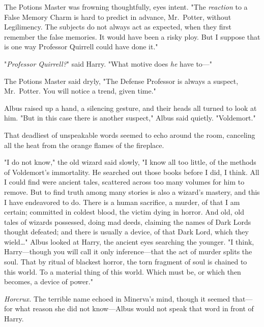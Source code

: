 The Potions Master was frowning thoughtfully, eyes intent. "The \emph{reaction} 
to a False Memory Charm is hard to predict in advance, Mr.~Potter, without 
Legilimency. The subjects do not always act as expected, when they first 
remember the false memories. It would have been a risky ploy. But I suppose 
that is one way Professor Quirrell could have done it."

"\emph{Professor Quirrell?}" said Harry. "What motive does \emph{he} have to---"

The Potions Master said dryly, "The Defense Professor is always a suspect, 
Mr.~Potter. You will notice a trend, given time."

Albus raised up a hand, a silencing gesture, and their heads all turned to look 
at him. "But in this case there is another suspect," Albus said quietly. 
"Voldemort."

That deadliest of unspeakable words seemed to echo around the room, canceling 
all the heat from the orange flames of the fireplace.

"I do not know," the old wizard said slowly, "I know all too little, of the 
methods of Voldemort's immortality. He searched out those books before I did, I 
think. All I could find were ancient tales, scattered across too many volumes 
for him to remove. But to find truth among many stories is also a wizard's 
mastery, and this I have endeavored to do. There is a human sacrifice, a 
murder, of that I am certain; committed in coldest blood, the victim dying in 
horror. And old, old tales of wizards possessed, doing mad deeds, claiming the 
names of Dark Lords thought defeated; and there is usually a device, of that 
Dark Lord, which they wield{\ldots}" Albus looked at Harry, the ancient eyes 
searching the younger. "I think, Harry---though you will call it only 
inference---that the act of murder splits the soul. That by ritual of blackest 
horror, the torn fragment of soul is chained to this world. To a material thing 
of this world. Which must be, or which then becomes, a device of power."

\emph{Horcrux.} The terrible name echoed in Minerva's mind, though it seemed 
that---for what reason she did not know---Albus would not speak that word in 
front of Harry.

